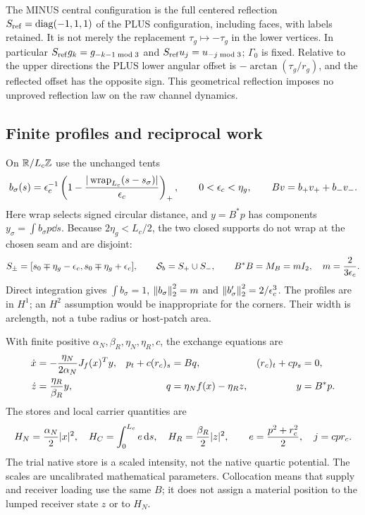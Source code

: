 The MINUS central configuration is the full centered reflection $S_{\rm ref}=\operatorname{diag}(-1,1,1)$ of the PLUS configuration, including faces, with labels retained. It is not merely the replacement $\tau_g\mapsto-\tau_g$ in the lower vertices. In particular $S_{\rm ref}g_k=g_{-k-1\bmod3}$ and $S_{\rm ref}u_j=u_{-j\bmod3}$; $\Gamma_0$ is fixed. Relative to the upper directions the PLUS lower angular offset is $-\arctan(\tau_g/r_g)$, and the reflected offset has the opposite sign. This geometrical reflection imposes no unproved reflection law on the raw channel dynamics.

\subsection{Finite profiles and reciprocal work}\label{sec:exchange}
On $\mathbb R/L_c\mathbb Z$ use the unchanged tents
\begin{equation}\label{eq:profiles}
 b_\sigma(s)=\epsilon_c^{-1}\left(1-\frac{|\operatorname{wrap}_{L_c}(s-s_\sigma)|}{\epsilon_c}\right)_+,
 \qquad 0<\epsilon_c<\eta_g,\qquad Bv=b_+v_++b_-v_-.
\end{equation}
Here wrap selects signed circular distance, and $y=B^*p$ has components $y_\sigma=\int b_\sigma p\dd s$. Because $2\eta_g<L_c/2$, the two closed supports do not wrap at the chosen seam and are disjoint:
\begin{equation}\label{eq:supports}
 S_\pm=[s_0\mp\eta_g-\epsilon_c,s_0\mp\eta_g+\epsilon_c],\qquad
 \mathcal S_b=S_+\cup S_-,\qquad B^*B=M_B=mI_2,\quad m=\frac{2}{3\epsilon_c}.
\end{equation}
Direct integration gives $\int b_\sigma=1$, $\left\lVert b_\sigma\right\rVert_2^2=m$ and $\left\lVert b'_\sigma\right\rVert_2^2=2/\epsilon_c^3$. The profiles are in $H^1$; an $H^2$ assumption would be inappropriate for the corners. Their width is arclength, not a tube radius or host-patch area.

With finite positive $\alpha_N,\beta_R,\eta_N,\eta_R,c$, the exchange equations are
\begin{equation}\label{eq:system}
 \begin{aligned}
 \dot x&=-\frac{\eta_N}{2\alpha_N}J_f(x)^Ty,&
 p_t+c(r_c)_s&=Bq,&(r_c)_t+cp_s&=0,\\
 \dot z&=\frac{\eta_R}{\beta_R}y,&q&=\eta_N f(x)-\eta_R z,&y&=B^*p.
 \end{aligned}
\end{equation}
The stores and local carrier quantities are
\begin{equation}\label{eq:stocks}
 H_N=\frac{\alpha_N}{2}|x|^2,\quad
 H_C=\int_0^{L_c} e\,\mathrm d s,\quad H_R=\frac{\beta_R}{2}|z|^2,
 \qquad e=\frac{p^2+r_c^2}{2},\quad j=cpr_c.
\end{equation}
The trial native store is a scaled intensity, not the native quartic potential. The scales are uncalibrated mathematical parameters. Collocation means that supply and receiver loading use the same $B$; it does not assign a material position to the lumped receiver state $z$ or to $H_N$.

